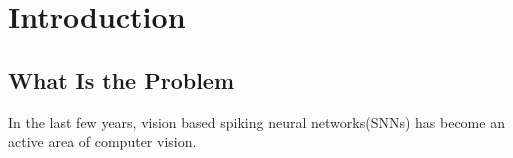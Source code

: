 \section{Introduction}
\label{sec:intro}
\subsection{What Is the Problem}
In the last few years, vision based spiking neural networks(SNNs) has become an active area of computer vision.
